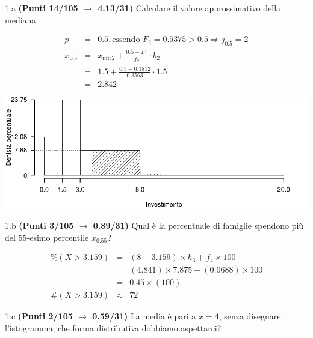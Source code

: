 \documentclass[
  11pt,
]{book}
\theoremstyle{mytheoremstyle}
\theoremstyle{mydefstyle}
\newenvironment{sol}
  {
  \begin{tcolorbox}[enhanced,breakable,arc=0.1mm,boxrule=1pt,colback=white,colframe=iblue,
  title=\bf \fontfamily{lmss}\selectfont \hspace{.5 cm} Soluzione,drop fuzzy shadow]

}{
\end{tcolorbox}
  }
\begin{document}
1.a \textbf{(Punti 14/105 \(\rightarrow\) 4.13/31)} Calcolare il valore approssimativo della mediana.

\begin{sol}

\begin{eqnarray*}
  p &=&  0.5 , \text{essendo }F_{ 2 }= 0.5375  > 0.5  \Rightarrow j_{ 0.5 }= 2 \\
  x_{ 0.5 } &=& x_{\text{inf}; 2 } + \frac{ { 0.5 } - F_{ 1 }} {f_{ 2 }} \cdot b_{ 2 } \\
            &=&  1.5  + \frac {{ 0.5 } -  0.1812 } { 0.3563 } \cdot  1.5  \\
            &=&  2.842 
\end{eqnarray*}

\begin{center}\includegraphics{Esami_passati_con_soluzioni_files/figure-latex/2024-95-1} \end{center}

\end{sol}

1.b \textbf{(Punti 3/105 \(\rightarrow\) 0.89/31)} Qual è la percentuale di famiglie spendono più del 55-esimo percentile \(x_{0.55}\)?

\begin{sol}
\begin{eqnarray*}
     \%(X> 3.159 ) &=& ( 8 - 3.159 )\times h_{ 3 }+ f_{ 4 }\times 100 \\
              &=& ( 4.841 )\times 7.875 + ( 0.0688 )\times 100 \\
              &=&  0.45 \times(100)\\
     \#(X> 3.159 ) &\approx& 72 
         \end{eqnarray*}

\end{sol}

1.c \textbf{(Punti 2/105 \(\rightarrow\) 0.59/31)} La media è pari a \(\bar x=4\), senza disegnare l'istogramma, che forma distributiva dobbiamo aspettarci?
\end{document}
